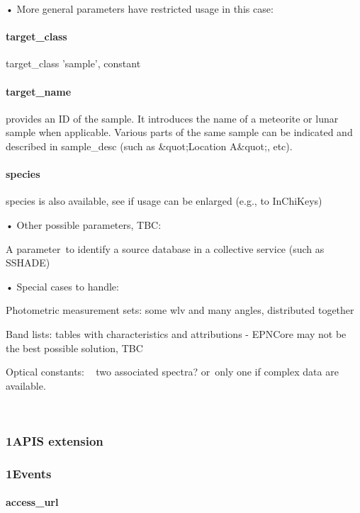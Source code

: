 \documentclass[11pt,a4paper]{ivoa}
\begin{document}
• More general parameters have restricted usage in this case:

\paragraph{target\_class\textbf{ }}

target\_class 'sample', constant

\paragraph{target\_name}

provides an ID of the sample. It introduces the name of a meteorite or lunar sample when applicable. Various parts of the same sample can be indicated and described in sample\_desc (such as \&quot;Location A\&quot;, etc).

\paragraph{species}

species is also available, see if usage can be enlarged (e.g., to InChiKeys)

• Other possible parameters, TBC:

A parameter to identify a source database in a collective service (such as SSHADE)

• Special cases to handle:

Photometric measurement sets: some wlv and many angles, distributed together

Band lists: tables with characteristics and attributions - EPNCore may not be the best possible solution, TBC

Optical constants: ~ two associated spectra? or only one if complex data are available.

\\

\subsubsection{1APIS extension\\}

\subsubsection{1Events\\}

\paragraph{access\_url\textbf{ }}
\end{document}

